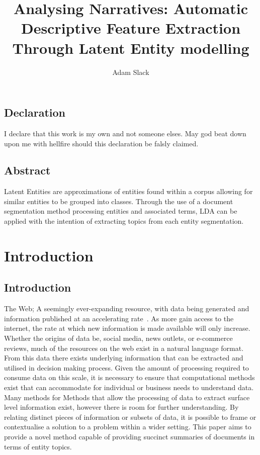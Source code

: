 \documentclass[10pt]{report}
\title{Analysing Narratives: Automatic Descriptive Feature Extraction Through Latent Entity modelling}
\author{Adam Slack}
\date{}
\begin{document}
 
\begin{titlepage}
  \maketitle
\end{titlepage}

\section*{Declaration}
I declare that this work is my own and not someone elses. May god beat down upon me with hellfire should this declaration be falsly claimed.


\newpage
{}
\section*{Abstract}
Latent Entities are approximations of entities found within a corpus allowing for similar entities to be grouped into classes. Through the use of a document segmentation method processing entities and associated terms, LDA can be applied with the intention of extracting topics from each entity segmentation.



\renewcommand{\baselinestretch}{0.5}\normalsize
\tableofcontents
\listoffigures
\listoftables
\renewcommand{\baselinestretch}{2.0}\normalsize

%
%
%
%
\chapter{Introduction}

\section{Introduction}
The Web; A seemingly ever-expanding resource, with data being generated and information published at an accelerating rate~\cite{WebServer-lc}. As more gain access to the internet, the rate at which new information is made available will only increase. Whether the origins of data be, social media, news outlets, or e-commerce reviews, much of the resources on the web exist in a natural language format. From this data there exists underlying information that can be extracted and utilised in decision making process. Given the amount of processing required to consume data on this scale, it is necessary to ensure that computational methods exist that can accommodate for individual or business needs to understand data. Many methods for Methods that allow the processing of data to extract surface level information exist, however there is room for further understanding. By relating distinct pieces of information or subsets of data, it is possible to frame or contextualise a solution to a problem within a wider setting. This paper aims to provide a novel method capable of providing succinct summaries of documents in terms of entity topics.
\end{document}
